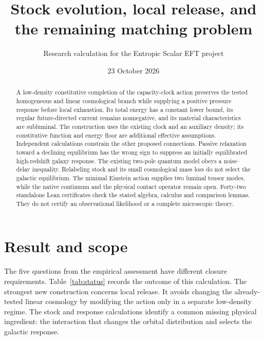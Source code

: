 \documentclass[11pt]{article}
\title{Stock evolution, local release, and the remaining matching problem}
\author{Research calculation for the Entropic Scalar EFT project}
\date{23 October 2026}
\begin{document}
\maketitle
\begin{abstract}
A low-density constitutive completion of the capacity-clock action preserves
the tested homogeneous and linear cosmological branch while supplying a
positive pressure response before local exhaustion. Its total energy has a
constant lower bound, its regular future-directed current remains nonnegative,
and its material characteristics are subluminal. The construction uses the
existing clock and an auxiliary density; its constitutive function and energy
floor are additional effective assumptions. Independent calculations constrain
the other proposed connections. Passive relaxation toward a declining
equilibrium has the wrong sign to suppress an initially equilibrated high-redshift
galaxy response. The existing two-pole quantum model obeys a noise--delay
inequality. Relabeling stock and its small cosmological mass loss do not select
the galactic equilibrium. The minimal Einstein action supplies two luminal
tensor modes, while the native continuum and the physical contact operator
remain open. Forty-two standalone Lean certificates check the stated algebra,
calculus and comparison lemmas. They do not certify an observational likelihood
or a complete microscopic theory.
\end{abstract}

\section{Result and scope}
The five questions from the empirical assessment have different closure
requirements. Table~\ref{tab:status} records the outcome of this calculation.
The strongest new construction concerns local release. It avoids changing the
already-tested linear cosmology by modifying the action only in a separate
low-density regime. The stock and response calculations identify a common
missing physical ingredient: the interaction that changes the orbital
distribution and selects the galactic response.
\end{document}
